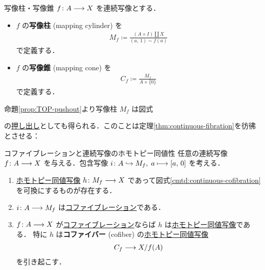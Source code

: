 \documentclass[algtopo_main]{subfiles}
\begin{document}
\begin{mydef}[label=def:cylinder-cone]{写像柱・写像錐}
    $f \colon A \longrightarrow X$ を連続写像とする．
    \begin{itemize}
        \item $f$ の\textbf{写像柱} (mapping cylinder) を
        \begin{align}
            M_f \coloneqq \frac{(A \times I) \amalg X}{(a,\, 1) \sim f(a)}
        \end{align}
        で定義する．
        \item $f$ の\textbf{写像錐} (mapping cone) を
        \begin{align}
            C_f \coloneqq \frac{M_f}{A \times \{0\}}
        \end{align}
        で定義する．
    \end{itemize}
\end{mydef}
命題\ref{prop:TOP-pushout}より写像柱 $M_f$ は図式
\begin{center}
\end{center}
の\hyperref[def:pushout]{押し出し}としても得られる．このことは定理\ref{thm:continuous-fibration}を彷彿とさせる：

\begin{mytheo}[label=thm:continuous-cofibration]{コファイブレーションと連続写像のホモトピー同値性}
    任意の連続写像 $f \colon A \longrightarrow X$ を与える．包含写像 $i \colon A \hookrightarrow M_f,\; a \longmapsto [a,\, 0]$ を考える．
    \begin{enumerate}
        \item \hyperref[def:homotopy-basic]{ホモトピー同値写像} $h \colon M_f \longrightarrow X$ であって図式\ref{cmtd:continuous-cofibration}を可換にするものが存在する．
        \item $i \colon A \longrightarrow M_f$ は\hyperref[def:cofibration]{コファイブレーション}である．
        \item $f \colon A \longrightarrow X$ が\hyperref[def:cofibration]{コファイブレーション}ならば $h$ は\hyperref[def:homotopy-basic]{ホモトピー同値写像}である．
        特に $h$ は\textbf{コファイバー} (cofiber) の\hyperref[def:homotopy-basic]{ホモトピー同値写像}
        \begin{align}
            C_f \longrightarrow X /f(A)
        \end{align}
        を引き起こす．
    \end{enumerate}
\end{mytheo}
\end{document}
